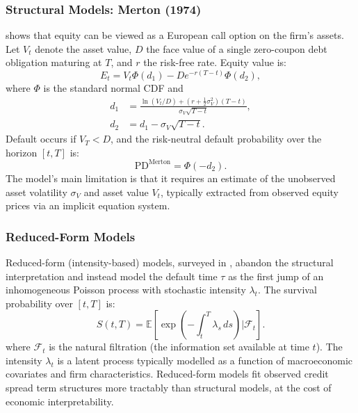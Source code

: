 \begin{context}
\subsubsection*{Structural Models: Merton (1974)}

\begin{deepdive}
\citet{merton1974pricing} shows that equity can be viewed as a European call option on the firm's assets. Let $V_t$ denote the asset value, $D$ the face value of a single zero-coupon debt obligation maturing at $T$, and $r$ the risk-free rate. Equity value is:
\begin{equation}
  E_t = V_t \Phi(d_1) - D e^{-r(T-t)} \Phi(d_2),
  \label{eq:merton-equity}
\end{equation}
where $\Phi$ is the standard normal CDF and
\begin{align}
  d_1 &= \frac{\ln(V_t / D) + (r + \tfrac{1}{2}\sigma_V^2)(T-t)}{\sigma_V \sqrt{T-t}}, \label{eq:merton-d1} \\
  d_2 &= d_1 - \sigma_V \sqrt{T-t}. \label{eq:merton-d2}
\end{align}
Default occurs if $V_T < D$, and the risk-neutral default probability over the horizon $[t, T]$ is:
\begin{equation}
  \text{PD}^{\text{Merton}} = \Phi(-d_2).
  \label{eq:merton-pd}
\end{equation}
The model's main limitation is that it requires an estimate of the unobserved asset volatility $\sigma_V$ and asset value $V_t$, typically extracted from observed equity prices via an implicit equation system.
\end{deepdive}

\subsubsection*{Reduced-Form Models}

Reduced-form (intensity-based) models, surveyed in \cite{duffie2003credit}, abandon the structural interpretation and instead model the default time $\tau$ as the first jump of an inhomogeneous Poisson process with stochastic intensity $\lambda_t$. The survival probability over $[t, T]$ is:
\begin{equation}
  S(t, T) = \mathbb{E}\!\left[\exp\!\left(-\int_t^T \lambda_s \, ds\right) \bigg| \mathcal{F}_t\right].
  \label{eq:survival-prob}
\end{equation}
where $\mathcal{F}_t$ is the natural filtration (the information set available at time $t$). The intensity $\lambda_t$ is a latent process typically modelled as a function of macroeconomic covariates and firm characteristics. Reduced-form models fit observed credit spread term structures more tractably than structural models, at the cost of economic interpretability.


\end{context}
